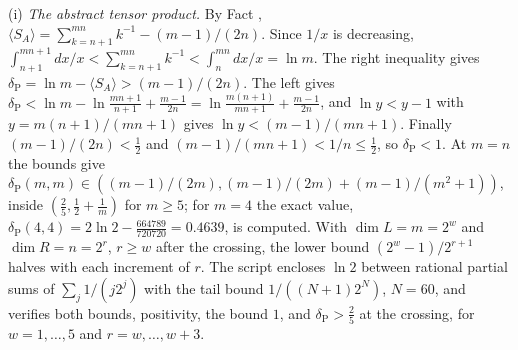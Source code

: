 (i) \emph{The abstract tensor product.} By Fact , $\langle S_{A}\rangle = \sum_{k=n+1}^{mn}k^{-1} - (m-1)/(2n)$. Since $1/x$ is decreasing, $\int_{n+1}^{mn+1}dx/x < \sum_{k=n+1}^{mn}k^{-1} < \int_{n}^{mn}dx/x = \ln m$. The right inequality gives $\delta_{\mathrm{P}} = \ln m - \langle S_{A}\rangle > (m-1)/(2n)$. The left gives $\delta_{\mathrm{P}} < \ln m - \ln\frac{mn + 1}{n + 1} + \frac{m - 1}{2n} = \ln\frac{m(n+1)}{mn + 1} + \frac{m - 1}{2n}$, and $\ln y < y - 1$ with $y = m(n+1)/(mn+1)$ gives $\ln y < (m - 1)/(mn + 1)$. Finally $(m-1)/(2n) < \tfrac12$ and $(m - 1)/(mn + 1) < 1/n \le \tfrac12$, so $\delta_{\mathrm{P}} < 1$. At $m = n$ the bounds give $\delta_{\mathrm{P}}(m, m) \in ((m-1)/(2m), (m-1)/(2m) + (m-1)/(m^{2} + 1))$, inside $(\tfrac25, \tfrac12 + \tfrac1m)$ for $m \ge 5$; for $m = 4$ the exact value, $\delta_{\mathrm{P}}(4, 4) = 2\ln 2 - \tfrac{664789}{720720} = 0.4639$, is computed. With $\dim L = m = 2^{w}$ and $\dim R = n = 2^{r}$, $r \ge w$ after the crossing, the lower bound $(2^{w} - 1)/2^{r+1}$ halves with each increment of $r$. The script encloses $\ln 2$ between rational partial sums of $\sum_{j}1/(j2^{j})$ with the tail bound $1/((N+1)2^{N})$, $N = 60$, and verifies both bounds, positivity, the bound $1$, and $\delta_{\mathrm{P}} > \tfrac25$ at the crossing, for $w = 1, \ldots, 5$ and $r = w, \ldots, w + 3$.

